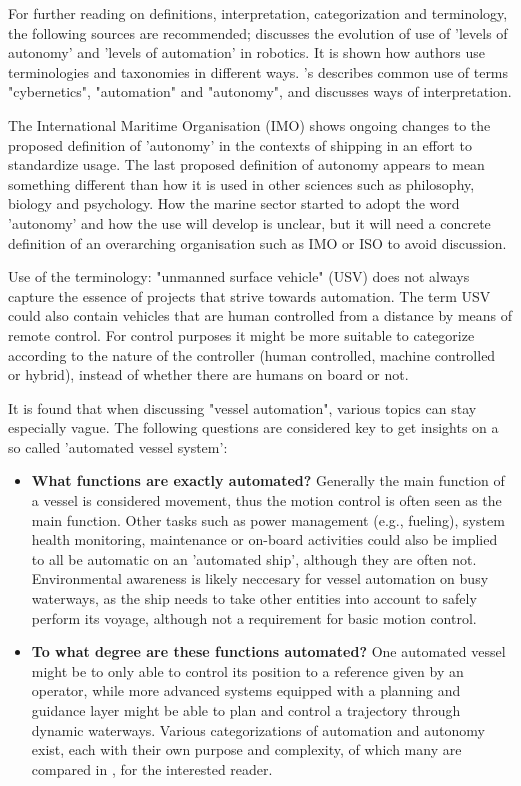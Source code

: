 For further reading on definitions, interpretation, categorization and terminology, the following sources are recommended; \citet{vagia2016literature} discusses the evolution of use of 'levels of autonomy' and 'levels of automation' in robotics. It is shown how authors use terminologies and taxonomies in different ways. \citet{smithers1997autonomy}'s describes common use of terms "cybernetics", "automation" and "autonomy", and discusses ways of interpretation. 

The International Maritime Organisation (IMO) shows ongoing changes to the proposed definition of 'autonomy' in the contexts of shipping \citet{IMO103ISORegulatoryScopingExMass} in an effort to standardize usage. The last proposed definition of autonomy appears to mean something different than how it is used in other sciences such as philosophy, biology and psychology. How the marine sector started to adopt the word 'autonomy' and how the use will develop is unclear, but it will need a concrete definition of an overarching organisation such as IMO or ISO to avoid discussion. 

Use of the terminology: "unmanned surface vehicle" (USV) does not always capture the essence of projects that strive towards automation. The term USV could also contain vehicles that are human controlled from a distance by means of remote control. For control purposes it might be more suitable to categorize according to the nature of the controller (human controlled, machine controlled or hybrid), instead of whether there are humans on board or not. 

It is found that when discussing "vessel automation", various topics can stay especially vague. The following questions are considered key to get insights on  a so called 'automated vessel system':
\begin{itemize}
	\item \textbf{What functions are exactly automated?} Generally the main function of a vessel is considered movement, thus the motion control is often seen as the main function. Other tasks such as power management (e.g., fueling), system health monitoring, maintenance or on-board activities could also be implied to  all be automatic on an 'automated ship', although they are often not. Environmental awareness is likely neccesary for vessel automation on busy waterways, as the ship needs to take other entities into account to safely perform its voyage, although not a requirement for basic motion control. 
	\item \textbf{To what degree are these functions automated?} One automated vessel might be to only able to control its position to a reference given by an operator, while more advanced systems equipped with a planning and guidance layer might be able to plan and control a trajectory through dynamic waterways. Various categorizations of automation and autonomy exist, each with their own purpose and complexity, of which many are compared in \citet{vagia2016literature}, for the interested reader.
\end{itemize}

